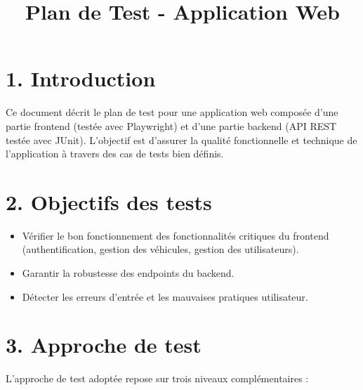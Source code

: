 \documentclass[a4paper,12pt]{article}
\title{\textbf{Plan de Test - Application Web}}
\author{}
\date{}
\begin{document}
\maketitle

\section*{1. Introduction}
Ce document décrit le plan de test pour une application web composée d'une partie frontend (testée avec Playwright) et d'une partie backend (API REST testée avec JUnit). L'objectif est d'assurer la qualité fonctionnelle et technique de l'application à travers des cas de tests bien définis.

\section*{2. Objectifs des tests}
\begin{itemize}
    \item Vérifier le bon fonctionnement des fonctionnalités critiques du frontend (authentification, gestion des véhicules, gestion des utilisateurs).
    \item Garantir la robustesse des endpoints du backend.
    \item Détecter les erreurs d'entrée et les mauvaises pratiques utilisateur.
\end{itemize}

\section*{3. Approche de test}

L’approche de test adoptée repose sur trois niveaux complémentaires :
\end{document}

